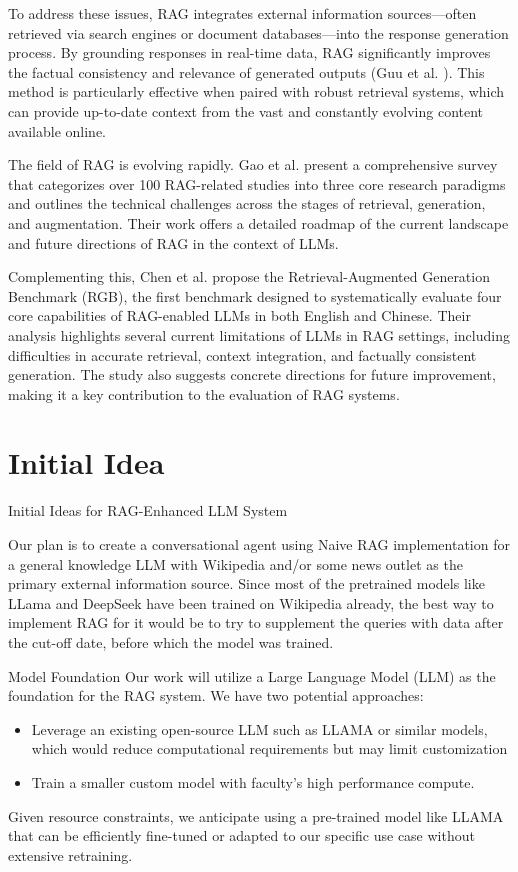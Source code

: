 \documentclass[fleqn,moreauthors,10pt]{ds_report}
\begin{document}
To address these issues, RAG integrates external information sources—often retrieved via search engines or document databases—into the response generation process. By grounding responses in real-time data, RAG significantly improves the factual consistency and relevance of generated outputs (Guu et al. \cite{guu}). This method is particularly effective when paired with robust retrieval systems, which can provide up-to-date context from the vast and constantly evolving content available online.

The field of RAG is evolving rapidly. Gao et al. \cite{gao} present a comprehensive survey that categorizes over 100 RAG-related studies into three core research paradigms and outlines the technical challenges across the stages of retrieval, generation, and augmentation. Their work offers a detailed roadmap of the current landscape and future directions of RAG in the context of LLMs.

Complementing this, Chen et al. \cite{chen} propose the Retrieval-Augmented Generation Benchmark (RGB), the first benchmark designed to systematically evaluate four core capabilities of RAG-enabled LLMs in both English and Chinese. Their analysis highlights several current limitations of LLMs in RAG settings, including difficulties in accurate retrieval, context integration, and factually consistent generation. The study also suggests concrete directions for future improvement, making it a key contribution to the evaluation of RAG systems.


\section*{Initial Idea}
Initial Ideas for RAG-Enhanced LLM System

Our plan is to create a conversational agent using Naive RAG implementation \cite{gao} for a general knowledge LLM with Wikipedia and/or some news outlet as the primary external information source. Since most of the pretrained models like LLama and DeepSeek have been trained on Wikipedia already, the best way to implement RAG for it would be to try to supplement the queries with data after the cut-off date, before which the model was trained.

Model Foundation
Our work will utilize a Large Language Model (LLM) as the foundation for the RAG system. We have two potential approaches:

\begin{itemize}[itemsep=0em]
\item Leverage an existing open-source LLM such as LLAMA or similar models, which would reduce computational requirements but may limit customization
\item Train a smaller custom model with faculty's high performance compute.
\end{itemize}
Given resource constraints, we anticipate using a pre-trained model like LLAMA that can be efficiently fine-tuned or adapted to our specific use case without extensive retraining.
\end{document}
